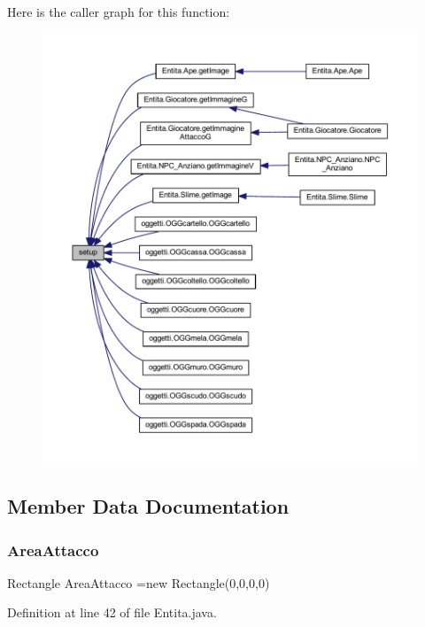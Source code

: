 Here is the caller graph for this function\+:
\nopagebreak
\begin{figure}[H]
\begin{center}
\leavevmode
\includegraphics[width=350pt]{class_entita_1_1_entita_a2f9ef9abd43cd7e34cd446aef3f499ab_icgraph}
\end{center}
\end{figure}


\subsection{Member Data Documentation}
\mbox{\label{class_entita_1_1_entita_aee10046794f54deadcafb19e0494a719}} 
\subsubsection{\texorpdfstring{Area\+Attacco}{AreaAttacco}}
{\footnotesize\ttfamily Rectangle Area\+Attacco =new Rectangle(0,0,0,0)}



Definition at line 42 of file Entita.\+java.

